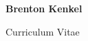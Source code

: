 \documentclass[11pt]{article}
\begin{document}
\begin{center}
  {%
    \huge\bf%
    Brenton Kenkel%
  }%

  \vspace{0.5em}

  {%
    \Large%
    Curriculum Vitae%
  }%
\end{center}


\end{document}
